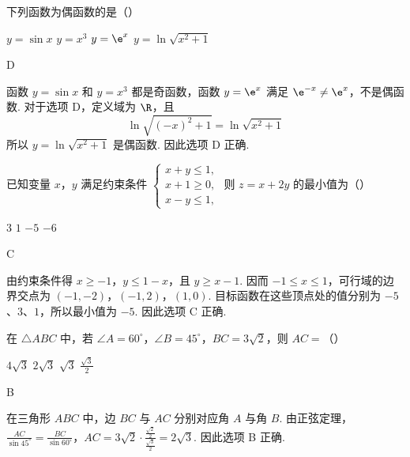 \begin{problem}
下列函数为偶函数的是（\quad）

\choices
    {\(y = \sin x\)}
    {\( y = x^{3} \)}
    {\(y = \e^{x}\)}
    {\( y = \ln \sqrt{x^2 + 1} \)}
\end{problem}

\begin{answer}
D
\end{answer}

\begin{solution}
函数 \(y=\sin x\) 和 \(y=x^3\) 都是奇函数，函数 \(y=\e^x\) 满足 \(\e^{-x}\ne\e^x\)，不是偶函数. 对于选项 D，定义域为 \(\R\)，且
\[
\ln\sqrt{(-x)^2+1}=\ln\sqrt{x^2+1}
\]
所以 \(y=\ln\sqrt{x^2+1}\) 是偶函数. 因此选项 D 正确.
\end{solution}

\begin{problem}
已知变量 \(x\)，\(y\) 满足约束条件 \(\begin{cases}
x + y \leqslant 1,\\
x + 1 \geqslant 0,\\
x - y \leqslant 1,
\end{cases}\) 则 \(z = x + 2y\) 的最小值为（\quad）

\choices
    {\(3\)}
    {\(1\)}
    {\(-5\)}
    {\(-6\)}
\end{problem}

\begin{answer}
C
\end{answer}

\begin{solution}
由约束条件得 \(x\geqslant-1\)，\(y\leqslant1-x\)，且 \(y\geqslant x-1\). 因而 \(-1\leqslant x\leqslant1\)，可行域的边界交点为
\((-1,-2)\)，\((-1,2)\)，\((1,0)\).
目标函数在这些顶点处的值分别为 \(-5\)、\(3\)、\(1\)，所以最小值为 \(-5\). 因此选项 C 正确.
\end{solution}

\begin{problem}
在 \(\triangle ABC\) 中，若 \(\angle A = 60^{\circ}\)，\(\angle B = 45^{\circ}\)，\(BC = 3\sqrt{2}\)，则 \(AC =\)（\quad）

\choices
    {\(4\sqrt{3}\)}
    {\(2\sqrt{3}\)}
    {\(\sqrt{3}\)}
    {\(\frac{\sqrt{3}}{2}\)}
\end{problem}

\begin{answer}
B
\end{answer}

\begin{solution}
在三角形 \(ABC\) 中，边 \(BC\) 与 \(AC\) 分别对应角 \(A\) 与角 \(B\). 由正弦定理，
\(\frac{AC}{\sin45^{\circ}}=\frac{BC}{\sin60^{\circ}}\)，\(AC=3\sqrt2\cdot\frac{\frac{\sqrt2}{2}}{\frac{\sqrt3}{2}}=2\sqrt3\).
因此选项 B 正确.
\end{solution}

